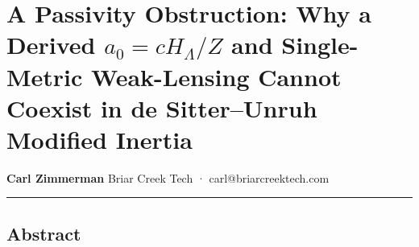 \documentclass[
]{article}
\author{}
\date{}
\begin{document}
\section{\texorpdfstring{A Passivity Obstruction: Why a Derived
\(a_0 = cH_\Lambda/Z\) and Single-Metric Weak-Lensing Cannot Coexist in
de Sitter--Unruh Modified
Inertia}{A Passivity Obstruction: Why a Derived a\_0 = cH\_\textbackslash Lambda/Z and Single-Metric Weak-Lensing Cannot Coexist in de Sitter--Unruh Modified Inertia}}\label{a-passivity-obstruction-why-a-derived-a_0-ch_lambdaz-and-single-metric-weak-lensing-cannot-coexist-in-de-sitterunruh-modified-inertia}

\textbf{Carl Zimmerman} Briar Creek Tech · carl@briarcreektech.com

\begin{center}\rule{0.5\linewidth}{0.5pt}\end{center}

\subsection{Abstract}\label{abstract}
\end{document}
